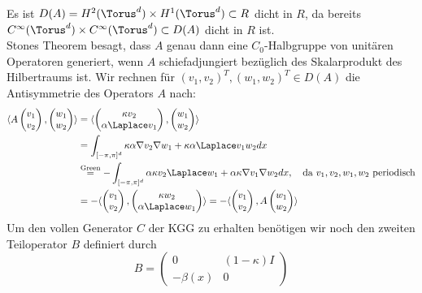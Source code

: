 Es ist $D(A)=H^2(\Torus^d)\times H^1(\Torus^d)\subset R$ dicht in $R$, da bereits $C^\infty(\Torus^d)\times C^\infty(\Torus^d)\subset D(A)$ dicht in $R$ ist.\\
Stones Theorem besagt, dass $A$ genau dann eine $C_0$-Halbgruppe von unitären Operatoren generiert, wenn $A$ schiefadjungiert bezüglich des Skalarprodukt des Hilbertraums ist. Wir rechnen für $(v_1,v_2)^T, (w_1,w_2)^T\in D(A)$ die Antisymmetrie des Operators $A$ nach:
\begin{align*}
\langle A\begin{pmatrix}v_1\\v_2\end{pmatrix}, \begin{pmatrix}w_1\\w_2\end{pmatrix}\rangle
&=\langle \begin{pmatrix}\kappa v_2\\\alpha \Laplace v_1\end{pmatrix}, \begin{pmatrix}w_1\\w_2\end{pmatrix}\rangle\\
&=\int_{[-\pi,\pi]^d}\kappa \alpha \nabla v_2\nabla w_1 + \kappa \alpha \Laplace v_1 w_2dx\\
&\stackrel{\text{Green}}{=}-\int_{[-\pi,\pi]^d}\alpha\kappa v_2\Laplace w_1+ \alpha\kappa \nabla v_1\nabla w_2dx,\quad \text{da $v_1,v_2,w_1,w_2$ periodisch}\\
&=-\langle \begin{pmatrix} v_1\\ v_2\end{pmatrix}, \begin{pmatrix}\kappa w_2\\\alpha \Laplace w_1\end{pmatrix}\rangle=-\langle \begin{pmatrix}v_1\\v_2\end{pmatrix}, A\begin{pmatrix}w_1\\w_2\end{pmatrix}\rangle
\end{align*}
Um den vollen Generator $C$ der KGG zu erhalten benötigen wir noch den zweiten Teiloperator $B$ definiert durch
\[B=\begin{pmatrix}0 & (1-\kappa)I\\-\beta(x) & 0\end{pmatrix}\]
